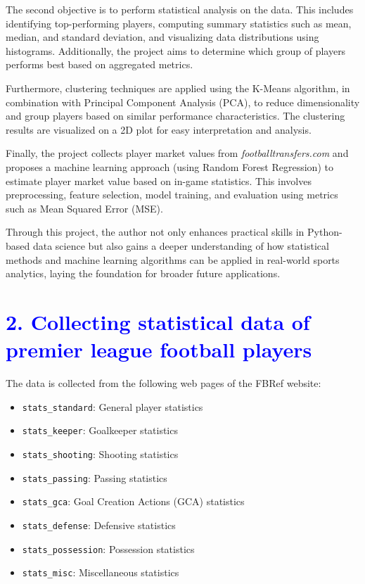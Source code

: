 \documentclass[a4paper,12pt]{article}
\begin{document}
The second objective is to perform statistical analysis on the data. This includes identifying top-performing players, computing summary statistics such as mean, median, and standard deviation, and visualizing data distributions using histograms. Additionally, the project aims to determine which group of players performs best based on aggregated metrics.

Furthermore, clustering techniques are applied using the K-Means algorithm, in combination with Principal Component Analysis (PCA), to reduce dimensionality and group players based on similar performance characteristics. The clustering results are visualized on a 2D plot for easy interpretation and analysis.

Finally, the project collects player market values from \textit{footballtransfers.com} and proposes a machine learning approach (using Random Forest Regression) to estimate player market value based on in-game statistics. This involves preprocessing, feature selection, model training, and evaluation using metrics such as Mean Squared Error (MSE).

Through this project, the author not only enhances practical skills in Python-based data science but also gains a deeper understanding of how statistical methods and machine learning algorithms can be applied in real-world sports analytics, laying the foundation for broader future applications.

\newpage
\section*{\textcolor{blue}{\Large 2. Collecting statistical data of premier league football players}}
The data is collected from the following web pages of the FBRef website:
\begin{itemize}
    \item \texttt{stats\_standard}: General player statistics
    \item \texttt{stats\_keeper}: Goalkeeper statistics
    \item \texttt{stats\_shooting}: Shooting statistics
    \item \texttt{stats\_passing}: Passing statistics
    \item \texttt{stats\_gca}: Goal Creation Actions (GCA) statistics
    \item \texttt{stats\_defense}: Defensive statistics
    \item \texttt{stats\_possession}: Possession statistics
    \item \texttt{stats\_misc}: Miscellaneous statistics
\end{itemize}
\end{document}

